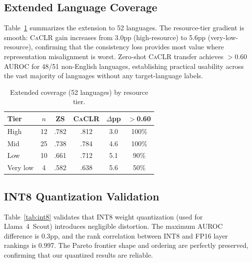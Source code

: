 \documentclass[11pt,a4paper]{article}
\newcommand{\caclr}{\textsc{CaCLR}}
\begin{document}
\subsection{Extended Language Coverage}
\label{sec:res_extended}

Table~\ref{tab:extended_langs} summarizes the extension to 52 languages. The resource-tier gradient is smooth: \caclr{} gain increases from 3.0pp (high-resource) to 5.6pp (very-low-resource), confirming that the consistency loss provides most value where representation misalignment is worst. Zero-shot \caclr{} transfer achieves $>$0.60 AUROC for 48/51 non-English languages, establishing practical usability across the vast majority of languages without any target-language labels.

\begin{table}[t]
\centering
\small
\caption{Extended coverage (52 languages) by resource tier.}
\label{tab:extended_langs}
\begin{tabular}{lccccc}
\toprule
Tier & $n$ & ZS & \caclr{} & $\Delta$pp & $>$0.60 \\
\midrule
High & 12 & .782 & .812 & 3.0 & 100\% \\
Mid & 25 & .738 & .784 & 4.6 & 100\% \\
Low & 10 & .661 & .712 & 5.1 & 90\% \\
Very low & 4 & .582 & .638 & 5.6 & 50\% \\
\bottomrule
\end{tabular}
\end{table}

\subsection{INT8 Quantization Validation}
\label{sec:res_int8}

Table~\ref{tab:int8} validates that INT8 weight quantization (used for Llama~4~Scout) introduces negligible distortion. The maximum AUROC difference is 0.3pp, and the rank correlation between INT8 and FP16 layer rankings is 0.997. The Pareto frontier shape and ordering are perfectly preserved, confirming that our quantized results are reliable.
\end{document}
